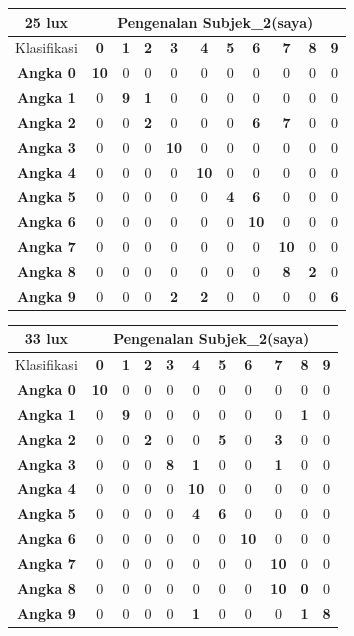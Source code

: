 \begin{tabular}{|c|c|c|c|c|c|c|c|c|c|c|}
\hline 25 lux
& \multicolumn{10}{|c|}{Pengenalan Subjek\_2(saya)} \\
\hline  Klasifikasi&\textbf{0} &\textbf{1} &\textbf{2} &\textbf{3} &\textbf{4}&\textbf{5} &\textbf{6}&\textbf{7}&\textbf{8}&\textbf{9}\\
\hline \textbf{Angka 0} &\textbf{10} &0 &0 &0 &0 &0 &0 &0 &0 &0\\
\hline \textbf{Angka 1} &0 &\textbf{9} &\textbf{1} &0 &0 &0 &0 &0 &0 &0\\
\hline \textbf{Angka 2} &0 &0 &\textbf{2} &0 &0 &0 &\textbf{6} &\textbf{7} &0 &0\\
\hline \textbf{Angka 3} &0 &0 &0 &\textbf{10} &0 &0 &0 &0 &0 &0\\
\hline \textbf{Angka 4} &0 &0 &0 &0 &\textbf{10} &0 &0 &0 &0 &0\\
\hline \textbf{Angka 5} &0 &0 &0 &0 &0 &\textbf{4} &\textbf{6} &0 &0 &0 \\
\hline \textbf{Angka 6} &0 &0 &0 &0 &0 &0 &\textbf{10} &0 &0 &0\\
\hline \textbf{Angka 7} &0 &0 &0 &0 &0 &0 &0 &\textbf{10} &0 &0\\
\hline \textbf{Angka 8} &0 &0 &0 &0 &0 &0 &0 &\textbf{8} &\textbf{2} &0 \\
\hline \textbf{Angka 9} &0 &0 &0 &\textbf{2} &\textbf{2} &0 &0 &0 &0 &\textbf{6} \\
\hline
\end{tabular}

\begin{tabular}{|c|c|c|c|c|c|c|c|c|c|c|}
	\hline 33 lux
	& \multicolumn{10}{|c|}{Pengenalan Subjek\_2(saya)} \\
	\hline  Klasifikasi&\textbf{0} &\textbf{1} &\textbf{2} &\textbf{3} &\textbf{4}&\textbf{5} &\textbf{6}&\textbf{7}&\textbf{8}&\textbf{9}\\
	\hline \textbf{Angka 0} &\textbf{10} &0 &0 &0 &0 &0 &0 &0 &0 &0\\
	\hline \textbf{Angka 1} &0 &\textbf{9} &0 &0 &0 &0 &0 &0 &\textbf{1} &0\\
	\hline \textbf{Angka 2} &0 &0 &\textbf{2} &0 &0 &\textbf{5} &0 &\textbf{3} &0 &0\\
	\hline \textbf{Angka 3} &0 &0 &0 &\textbf{8} &\textbf{1} &0 &0 &\textbf{1} &0 &0\\
	\hline \textbf{Angka 4} &0 &0 &0 &0 &\textbf{10} &0 &0 &0 &0 &0\\
	\hline \textbf{Angka 5} &0 &0 &0 &0 &\textbf{4} &\textbf{6} &0 &0 &0 &0 \\
	\hline \textbf{Angka 6} &0 &0 &0 &0 &0 &0 &\textbf{10} &0 &0 &0\\
	\hline \textbf{Angka 7} &0 &0 &0 &0 &0 &0 &0 &\textbf{10} &0 &0\\
	\hline \textbf{Angka 8} &0 &0 &0 &0 &0 &0 &0 &\textbf{10} &\textbf{0} &0 \\
	\hline \textbf{Angka 9} &0 &0 &0 &0 &\textbf{1} &0 &0 &0 &\textbf{1} &\textbf{8} \\
	\hline
\end{tabular}

